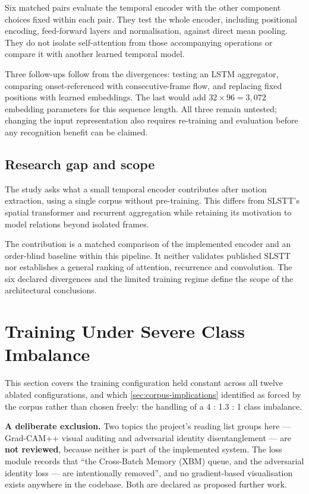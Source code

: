 Six matched pairs evaluate the temporal encoder with the other component choices fixed within each pair. They test the whole encoder, including positional encoding, feed-forward layers and normalisation, against direct mean pooling. They do not isolate self-attention from those accompanying operations or compare it with another learned temporal model.

Three follow-ups follow from the divergences: testing an LSTM aggregator, comparing onset-referenced with consecutive-frame flow, and replacing fixed positions with learned embeddings. The last would add $32\times96=3{,}072$ embedding parameters for this sequence length. All three remain untested; changing the input representation also requires re-training and evaluation before any recognition benefit can be claimed.

\subsection{Research gap and scope}
\label{sec:transformer-gap}

The study asks what a small temporal encoder contributes after motion extraction, using a single corpus without pre-training. This differs from SLSTT's spatial transformer and recurrent aggregation while retaining its motivation to model relations beyond isolated frames.

The contribution is a matched comparison of the implemented encoder and an order-blind baseline within this pipeline. It neither validates published SLSTT nor establishes a general ranking of attention, recurrence and convolution. The six declared divergences and the limited training regime define the scope of the architectural conclusions.


\section{Training Under Severe Class Imbalance}
\label{sec:imbalance-review}

This section covers the training configuration held constant across all twelve ablated configurations, and which \autoref{sec:corpus-implications} identified as forced by the corpus rather than chosen freely: the handling of a 4 : 1.3 : 1 class imbalance.

\textbf{A deliberate exclusion.} Two topics the project's reading list groups here --- Grad-CAM++ visual auditing and adversarial identity disentanglement --- are \textbf{not reviewed}, because neither is part of the implemented system. The loss module records that ``the Cross-Batch Memory (XBM) queue, and the adversarial identity loss --- are intentionally removed'', and no gradient-based visualisation exists anywhere in the codebase. Both are declared as proposed further work.

